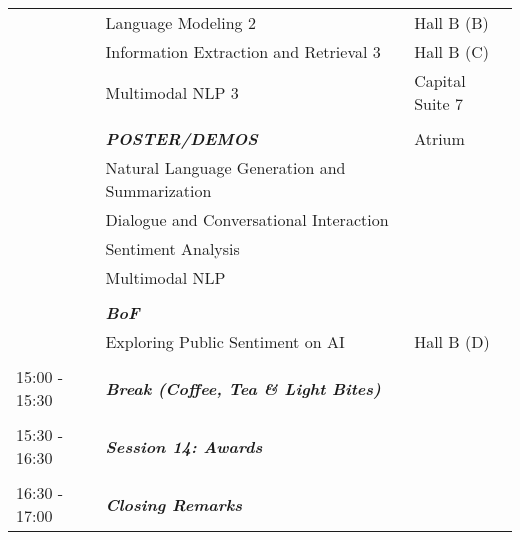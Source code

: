 \begin{longtable}{p{15mm}p{60mm}p{30mm}}
& Language Modeling 2 & Hall B (B) \\
& Information Extraction and Retrieval 3 & Hall B (C) \\
& Multimodal NLP 3 & Capital Suite 7 \\\\
& \emph{\textbf{POSTER/DEMOS}} & Atrium \\
& Natural Language Generation and Summarization & \\
& Dialogue and Conversational Interaction & \\
& Sentiment Analysis & \\
& Multimodal NLP & \\\\
& \emph{\textbf{BoF}} & \\
& Exploring Public Sentiment on AI & Hall B (D) \\\\
{15:00 - 15:30} & \emph{\textbf{Break (Coffee, Tea \& Light Bites)}} & \\\\
{15:30 - 16:30} & \emph{\textbf{Session 14: Awards}} & \\\\
{16:30 - 17:00} & \emph{\textbf{Closing Remarks}} & \\
\end{longtable}
